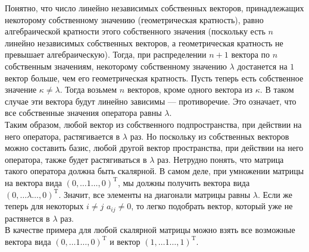 \documentclass{article}
\begin{document}
Понятно, что число линейно независимых собственных векторов, принадлежащих некоторому собственному значению (геометрическая кратность), равно алгебраической кратности этого собственного значения (поскольку есть $n$ линейно независимых собственных векторов, а геометрическая кратность не превышает алгебраическую). Тогда, при распределении $n+1$ вектора по $n$ собственным значениям, некоторому собственному значению $\lambda$ достанется на $1$ вектор больше, чем его геометрическая кратность. Пусть теперь есть собственное значение $\kappa \neq \lambda$. Тогда возьмем $n$ векторов, кроме одного вектора из $\kappa$. В таком случае эти вектора будут линейно зависимы --- противоречие. Это означает, что все собственные значения оператора равны $\lambda$.\\
Таким образом, любой вектор из собственного подпространства, при действии на него оператора, растягивается в $\lambda$ раз. Но поскольку из собственных векторов можно составить базис, любой другой вектор пространства, при действии на него оператора, также будет растягиваться в $\lambda$ раз. Нетрудно понять, что матрица такого оператора должна быть скалярной. В самом деле, при умножении матрицы на вектора вида $(0,\ldots 1 \ldots ,0)^\mathrm{T}$, мы должны получить вектора вида $(0,\ldots \lambda \ldots ,0)^\mathrm{T}$. Значит, все элементы на диагонали матрицы равны $\lambda$. Если же теперь для некоторых $i\neq j$ $a_{ij}\neq 0$, то легко подобрать вектор, который уже не растянется в $\lambda$ раз.\\
В качестве примера для любой скалярной матрицы можно взять все возможные вектора вида $(0,\ldots 1 \ldots ,0)^\mathrm{T}$ и вектор $(1,\ldots 1 \ldots, 1)^\mathrm{T}$.
\end{document}
